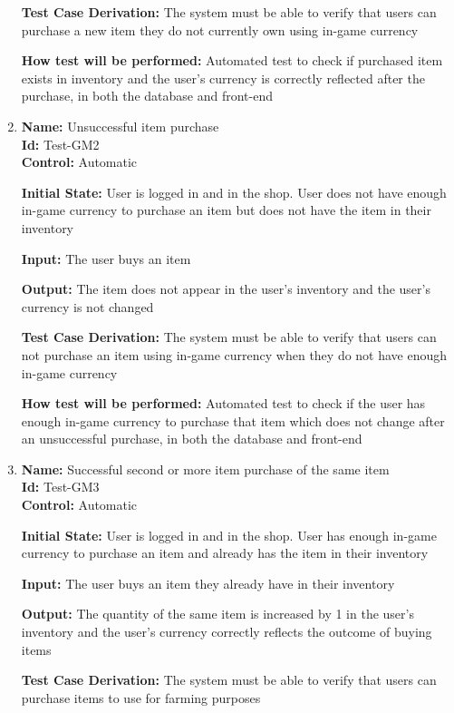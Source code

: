 \documentclass[12pt, titlepage]{article}
\begin{document}
\begin{enumerate}
\textbf{Test Case Derivation:} The system must be able to verify that users can purchase a new item they do not currently own using in-game currency

\textbf{How test will be performed:} Automated test to check if purchased item exists in inventory and the user's currency is correctly reflected after the purchase, in both the database and front-end

\item {\textbf{Name:} Unsuccessful item purchase\\} %
\textbf{Id:} Test-GM2 \label{Test-GM2}\\

\textbf{Control:} Automatic

\textbf{Initial State:} User is logged in and in the shop. User does not have enough in-game currency to purchase an item but does not have the item in their inventory

\textbf{Input:} The user buys an item

\textbf{Output:} The item does not appear in the user's inventory and the user's currency is not changed

\textbf{Test Case Derivation:} The system must be able to verify that users can not purchase an item using in-game currency when they do not have enough in-game currency

\textbf{How test will be performed:} Automated test to check if the user has enough in-game currency to purchase that item which does not change after an unsuccessful purchase, in both the database and front-end

\item {\textbf{Name:} Successful second or more item purchase of the same item\\} %
\textbf{Id:} Test-GM3 \label{Test-GM3}\\
\textbf{Control:} Automatic

\textbf{Initial State:} User is logged in and in the shop. User has enough in-game currency to purchase an item and already has the item in their inventory

\textbf{Input:} The user buys an item they already have in their inventory 

\textbf{Output:} The quantity of the same item is increased by 1 in the user's inventory and the user's currency correctly reflects the outcome of buying items

\textbf{Test Case Derivation: }The system must be able to verify that users can purchase items to use for farming purposes


\end{enumerate}
\end{document}
